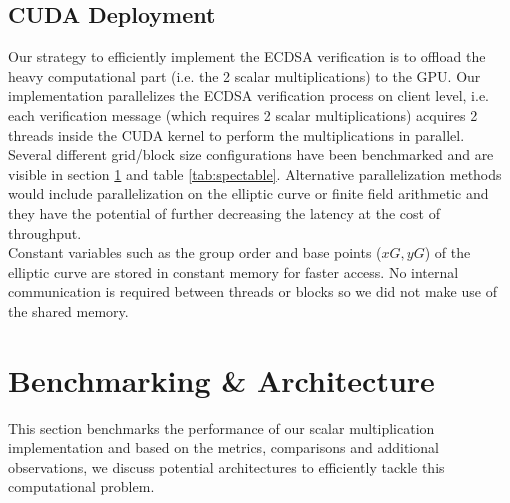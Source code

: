 \documentclass[11pt,twocolumn]{IEEEtran}
\begin{document}
\subsection{CUDA Deployment}\label{deploy}
Our strategy to efficiently implement the ECDSA verification is to offload the heavy computational part (i.e. the 2 scalar multiplications) to the GPU. Our implementation parallelizes the ECDSA verification process on client level, i.e. each verification message (which requires 2 scalar multiplications) acquires 2 threads inside the CUDA kernel to perform the multiplications in parallel. Several different grid/block size configurations have been benchmarked and are visible in section \ref{benchmarks} and table \ref{tab:spectable}. Alternative parallelization methods would include parallelization on the elliptic curve or finite field arithmetic and they have the potential of further decreasing the latency at the cost of throughput.\\
Constant variables such as the group order and base points ($xG, yG$) of the elliptic curve are stored in constant memory for faster access. No internal communication is required between threads or blocks so we did not make use of the shared memory.
\section{Benchmarking \& Architecture}\label{benchmarks}
This section benchmarks the performance of our scalar multiplication implementation and based on the metrics, comparisons and additional observations, we discuss potential architectures to efficiently tackle this computational problem.
\end{document}
